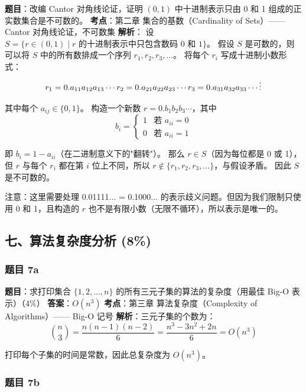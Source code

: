 \documentclass[10pt,a4paper,openany]{ctexbook}
\theoremstyle{definition}
\theoremstyle{remark}
\renewenvironment{quote}
  {\list{}{\leftmargin=1em\rightmargin=0pt\topsep=0.5pt\partopsep=0pt}\item[]}
  {\endlist}
\begin{document}
\textbf{题目}：改编 Cantor 对角线论证，证明 $(0,1)$ 中十进制表示只由 0 和 1 组成的正实数集合是不可数的。
\textbf{考点}：第二章 集合的基数（Cardinality of Sets）—— Cantor 对角线论证，不可数集
\textbf{解析}：
设 $S = \{ r \in (0,1) \mid r\text{ 的十进制表示中只包含数码 0 和 1} \}$。
假设 $S$ 是可数的，则可以将 $S$ 中的所有数排成一个序列 $r_1, r_2, r_3, \ldots$。
将每个 $r_i$ 写成十进制小数形式：
\[
r_1 = 0.a_{11}a_{12}a_{13}\cdots \\
r_2 = 0.a_{21}a_{22}a_{23}\cdots \\
r_3 = 0.a_{31}a_{32}a_{33}\cdots \\
\vdots
\]

其中每个 $a_{ij} \in \{0, 1\}$。
构造一个新数 $r = 0.b_1b_2b_3\cdots$，其中
\[
b_i = \begin{cases}
1 & \text{若 } a_{ii} = 0 \\
0 & \text{若 } a_{ii} = 1
\end{cases}
\]

即 $b_i = 1 - a_{ii}$（在二进制意义下的"翻转"）。
那么 $r \in S$（因为每位都是 0 或 1），但 $r$ 与每个 $r_i$ 都在第 $i$ 位上不同，所以 $r \notin \{r_1, r_2, r_3, \ldots\}$，与假设矛盾。
因此 $S$ 是不可数的。
\begin{quote}
注意：这里需要处理 0.01111... = 0.1000... 的表示歧义问题。但因为我们限制只使用 0 和 1，且构造的 $r$ 也不是有限小数（无限不循环），所以表示是唯一的。

\end{quote}
\vspace{-2pt}

\subsection{七、算法复杂度分析 (8\%)}

\subsubsection{题目 7a}

\textbf{题目}：求打印集合 $\{1, 2, \ldots, n\}$ 的所有三元子集的算法的复杂度（用最佳 Big-O 表示）（4\%）
\textbf{答案}：$O(n^3)$
\textbf{考点}：第三章 算法复杂度（Complexity of Algorithms）—— Big-O 记号
\textbf{解析}：三元子集的个数为：
\[
\binom{n}{3} = \frac{n(n-1)(n-2)}{6} = \frac{n^3 - 3n^2 + 2n}{6} = O(n^3)
\]

打印每个子集的时间是常数，因此总复杂度为 $O(n^3)$。
\vspace{-2pt}

\subsubsection{题目 7b}
\end{document}
